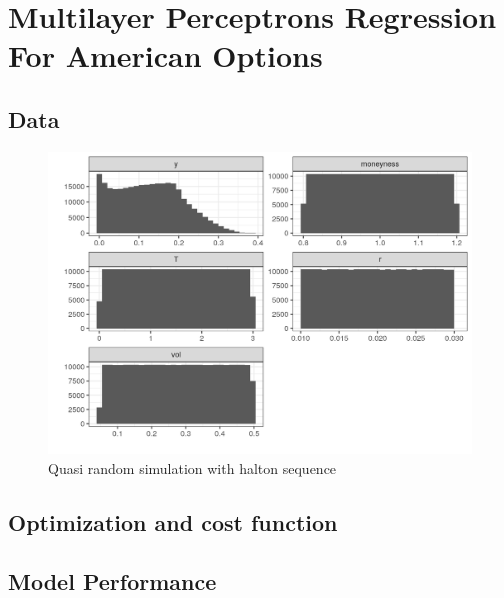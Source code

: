 \section{Multilayer Perceptrons Regression For American Options}

\subsection{Data}

\begin{figure}[th]
\centering
\includegraphics{Figures/marginalAmerPut.png}
\decoRule
\caption[Marginal distributions for american put]{Quasi random simulation with halton sequence}
\label{fig:marginalEuro}
\end{figure}

\subsection{Optimization and cost function}

\subsection{Model Performance}

